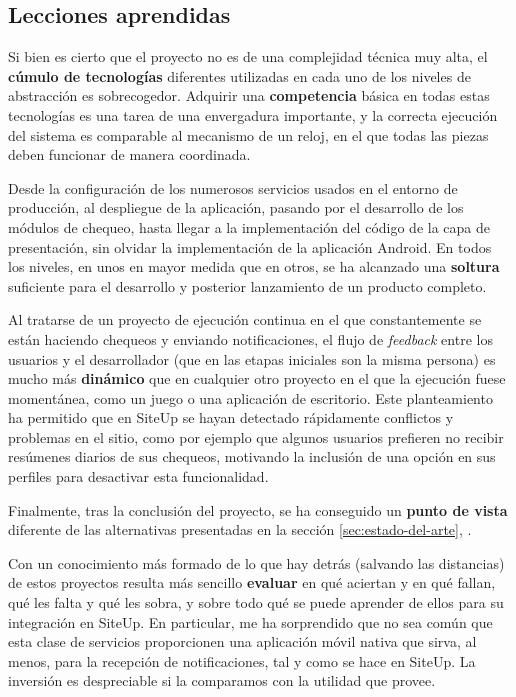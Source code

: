 \subsection{Lecciones aprendidas}

Si bien es cierto que el proyecto no es de una complejidad técnica muy alta, el
\textbf{cúmulo de tecnologías} diferentes utilizadas en cada uno de los niveles
de abstracción es sobrecogedor. Adquirir una \textbf{competencia} básica en
todas estas tecnologías es una tarea de una envergadura importante, y la
correcta ejecución del sistema es comparable al mecanismo de un reloj, en el que
todas las piezas deben funcionar de manera coordinada.

Desde la configuración de los numerosos servicios usados en el entorno de
producción, al despliegue de la aplicación, pasando por el desarrollo de los
módulos de chequeo, hasta llegar a la implementación del código de la capa de
presentación, sin olvidar la implementación de la aplicación Android. En todos
los niveles, en unos en mayor medida que en otros, se ha alcanzado una
\textbf{soltura} suficiente para el desarrollo y posterior lanzamiento de un
producto completo.

Al tratarse de un proyecto de ejecución continua en el que constantemente se
están haciendo chequeos y enviando notificaciones, el flujo de \textit{feedback}
entre los usuarios y el desarrollador (que en las etapas iniciales son la misma
persona) es mucho más \textbf{dinámico} que en cualquier otro proyecto en el que
la ejecución fuese momentánea, como un juego o una aplicación de
escritorio. Este planteamiento ha permitido que en SiteUp se hayan detectado
rápidamente conflictos y problemas en el sitio, como por ejemplo que algunos
usuarios prefieren no recibir resúmenes diarios de sus chequeos, motivando la
inclusión de una opción en sus perfiles para desactivar esta funcionalidad.

Finalmente, tras la conclusión del proyecto, se ha conseguido un \textbf{punto
  de vista} diferente de las alternativas presentadas en la sección
\ref{sec:estado-del-arte}, \textit{}. 

Con un conocimiento más formado de lo que hay detrás (salvando las distancias)
de estos proyectos resulta más sencillo \textbf{evaluar} en qué aciertan y en
qué fallan, qué les falta y qué les sobra, y sobre todo qué se puede aprender de
ellos para su integración en SiteUp. En particular, me ha sorprendido que no sea
común que esta clase de servicios proporcionen una aplicación móvil nativa que
sirva, al menos, para la recepción de notificaciones, tal y como se hace en
SiteUp. La inversión es despreciable si la comparamos con la utilidad que
provee.


